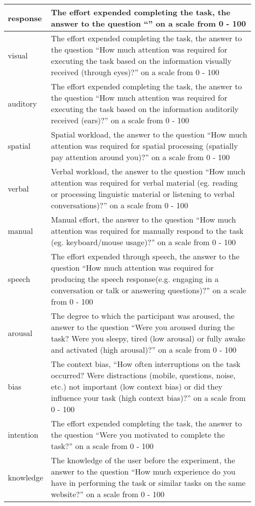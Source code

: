 \begin{table}[]
\begin{tabular}{|l|p{8cm}|}
 response & The effort expended completing the task, the answer to the question ``'' on a scale from 0 - 100 \\ \hline
 visual & The effort expended completing the task, the answer to the question ``How much attention was required for executing the task based on the information visually received (through eyes)?'' on a scale from 0 - 100 \\ \hline
 auditory & The effort expended completing the task, the answer to the question ``How much attention was required for executing the task based on the information auditorily received (ears)?'' on a scale from 0 - 100 \\ \hline
 spatial & Spatial workload, the answer to the question ``How much attention was required for spatial processing (spatially pay attention around you)?'' on a scale from 0 - 100 \\ \hline
 verbal & Verbal workload, the answer to the question ``How much attention was required for verbal material (eg. reading or processing linguistic material or listening to verbal conversations)?'' on a scale from 0 - 100 \\ \hline
 manual & Manual effort, the answer to the question ``How much attention was required for manually respond to the task (eg. keyboard/mouse usage)?'' on a scale from 0 - 100 \\ \hline
 speech & The effort expended through speech, the answer to the question ``How much attention was required for producing the speech response(e.g. engaging in a conversation or talk or answering questions)?'' on a scale from 0 - 100 \\ \hline
 arousal & The degree to which the participant was aroused, the answer to the question ``Were you aroused during the task? Were you sleepy, tired (low arousal) or fully awake and activated (high arousal)?'' on a scale from 0 - 100 \\ \hline
 bias & The context bias, ``How often interruptions on the task occurred? Were distractions (mobile, questions, noise, etc.) not important (low context bias) or did they influence your task (high context bias)?'' on a scale from 0 - 100 \\ \hline
 intention &  The effort expended completing the task, the answer to the question ``Were you motivated to complete the task?'' on a scale from 0 - 100 \\ \hline
 knowledge & The knowledge of the user before the experiment, the answer to the question ``How much experience do you have in performing the task or similar tasks on the same website?'' on a scale from 0 - 100 \\ \hline

\end{tabular}
\end{table}
